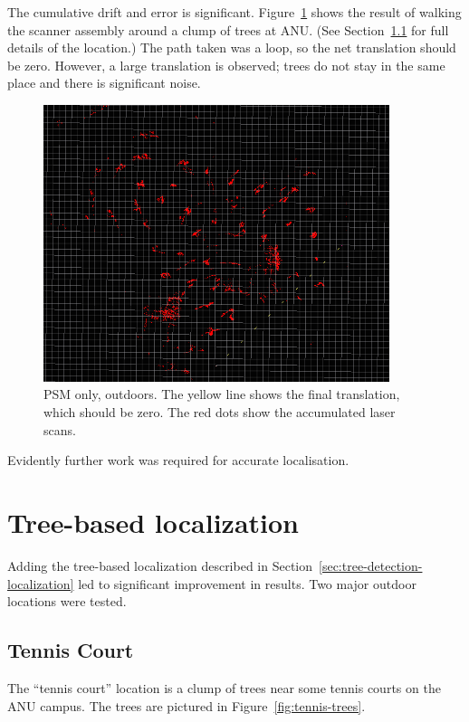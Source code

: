 \documentclass[12pt,oneside,a4paper]{book}
\begin{document}
The cumulative drift and error is
significant. Figure~\ref{fig:psm-outdoor} shows the result of walking
the scanner assembly around a clump of trees at ANU. (See
Section~\ref{sec:tennis-court} for full details of the location.) The
path taken was a loop, so the net translation should be zero. However, a
large translation is observed; trees do not stay in the same place and
there is significant noise.

\begin{figure}
  \centering
  \includegraphics[width=0.9\textwidth]{figs/psm-outdoor}
  \caption{PSM only, outdoors. The yellow line shows the final
    translation, which should be zero. The red dots show the
    accumulated laser scans.}
  \label{fig:psm-outdoor}
\end{figure}

Evidently further work was required for accurate localisation.
\newpage~\newpage
\section{Tree-based localization}
\label{sec:tree-based-local}

Adding the tree-based localization described in
Section~\ref{sec:tree-detection-localization} led to significant
improvement in results. Two major outdoor locations were tested.

\subsection{Tennis Court}
\label{sec:tennis-court}

The ``tennis court'' location is a clump of trees near some tennis
courts on the ANU campus. The trees are pictured in
Figure~\ref{fig:tennis-trees}.
\end{document}
